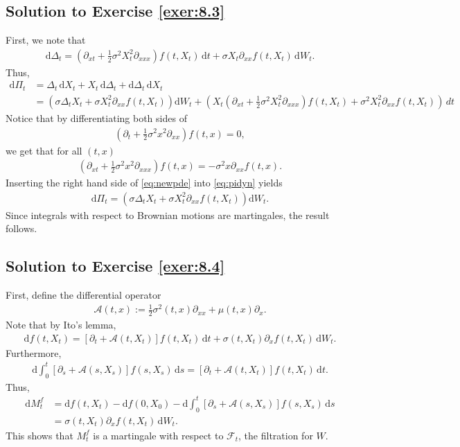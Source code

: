 \documentclass[12pt]{book}
\numberwithin{equation}{chapter}
\theoremstyle{plain}
\numberwithin{theorem}{section}
\theoremstyle{definition}
\numberwithin{exercise}{chapter}
\newcommand{\<}{\langle}
\renewcommand{\>}{\rangle}
\renewcommand{\(}{\left(}
\renewcommand{\)}{\right)}
\renewcommand{\[}{\left[}
\renewcommand{\]}{\right]}
\newcommand\Ac{\mathscr{A}}
\newcommand\Fc{\mathscr{F}}
\newcommand\sig{\sigma}
\renewcommand\d{\partial}
\newcommand\dd{\mathrm{d}}
\begin{document}
\subsection*{Solution to Exercise \ref{exer:8.3}}
First, we note that 
\begin{align}
\dd \Delta_t
	= \( \d_{xt} + \frac{1}{2} \sig^2 X_t^2 \d_{xxx} \) f(t,X_t)\, \dd t + \sig X_t \d_{xx} f(t,X_t)\, \dd W_t.
\end{align}
Thus, 
\begin{align}
\dd \Pi_t
	&= \Delta_t\, \dd X_t + X_t\, \dd \Delta_t + \dd \Delta_t\, \dd X_t \\
	&= \( \sig \Delta_t X_t + \sig X_t^2 \d_{xx} f(t,X_t)\)\dd W_t 
		+ \( X_t \( \d_{xt} + \frac{1}{2} \sig^2 X_t^2 \d_{xxx} \) f(t,X_t) + \sig^2 X_t^2 \d_{xx} f(t,X_t) \)\, dt 
\label{eq:pidyn}
\end{align}
Notice that by differentiating both sides of 
\begin{align}
\( \d_t + \frac{1}{2} \sig^2 x^2 \d_{xx} \) f(t,x) 
	= 0,
\end{align}
we get that for all $(t,x)$
\begin{align}
\( \d_{xt} + \frac{1}{2} \sig^2 x^2 \d_{xxx} \) f(t,x) 
	= - \sig^2 x \d_{xx} f(t,x). \label{eq:newpde}
\end{align}
Inserting the right hand side of \eqref{eq:newpde} into \eqref{eq:pidyn} yields 
\begin{align}
\dd \Pi_t
	= \( \sig \Delta_t X_t + \sig X_t^2 \d_{xx} f(t,X_t)\)\dd W_t.
\end{align}
Since integrals with respect to Brownian motions are martingales, the result follows.

\subsection*{Solution to Exercise \ref{exer:8.4}}
First, define the differential operator
\begin{align}
\Ac(t,x) 
	:= \frac{1}{2} \sig^2(t,x) \d_{xx} + \mu(t,x) \d_x.
\end{align}
Note that by Ito's lemma,
\begin{align}
\dd f(t,X_t)
	= \[\d_t + \Ac(t,X_t)\] f(t,X_t)\, \dd t +  \sig(t,X_t) \d_x f(t,X_t) \, \dd W_t.
\end{align}
Furthermore,
\begin{align}
\dd \int_0^t \[ \d_s + \Ac(s,X_s) \] f(s,X_s)\, \dd s
	=  \[ \d_t + \Ac(t,X_t) \] f(t,X_t)\, \dd t.
\end{align}
Thus, 
\begin{align}
\dd M_t^f 
	&= \dd f(t,X_t)- \dd f(0,X_0) - \dd \int_0^t \[ \d_s + \Ac(s,X_s) \] f(s,X_s)\, \dd s \\
	&= \sig(t,X_t) \d_x f(t,X_t) \, \dd W_t. 
\end{align}
This shows that $M_t^f$ is a martingale with respect to $\Fc_t$, the filtration for $W$.
\end{document}
